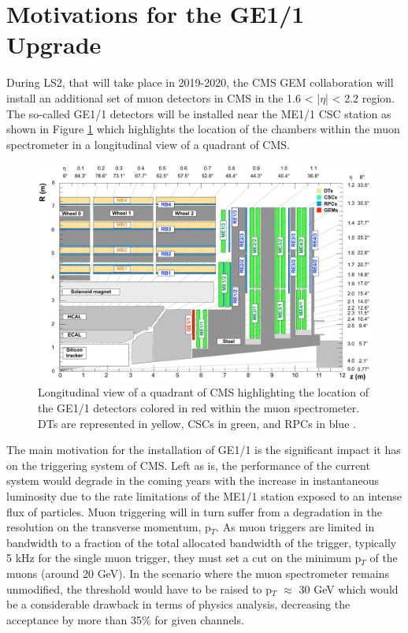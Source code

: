   \section{Motivations for the GE1/1 Upgrade}

    During LS2, that will take place in 2019-2020, the CMS GEM collaboration will install an additional set of muon detectors in CMS in the 1.6 < |$\eta$| < 2.2 region. The so-called GE1/1 detectors will be installed near the ME1/1 CSC station as shown in Figure \ref{fig:II-1-ge11} which highlights the location of the chambers within the muon spectrometer in a longitudinal view of a quadrant of CMS. \\

    \begin{figure}[t!]
      \centering
      \includegraphics[width=\textwidth]{img/II-1-gem/ge11-quadrant.pdf}
      \caption{Longitudinal view of a quadrant of CMS highlighting the location of the GE1/1 detectors colored in red within the muon spectrometer. DTs are represented in yellow, CSCs in green, and RPCs in blue \cite{Colaleo:2021453}.}
      \label{fig:II-1-ge11}
    \end{figure}

    The main motivation for the installation of GE1/1 is the significant impact it has on the triggering system of CMS. Left as is, the performance of the current system would degrade in the coming years with the increase in instantaneous luminosity due to the rate limitations of the ME1/1 station exposed to an intense flux of particles. Muon triggering will in turn suffer from a degradation in the resolution on the transverse momentum, p$_T$. As muon triggers are limited in bandwidth to a fraction of the total allocated bandwidth of the trigger, typically 5 kHz for the single muon trigger, they must set a cut on the minimum p$_T$ of the muons (around 20 GeV). In the scenario where the muon spectrometer remains unmodified, the threshold would have to be raised to p$_T$ $ \approx $ 30 GeV which would be a considerable drawback in terms of physics analysis, decreasing the acceptance by more than 35\% for given channels. \\


